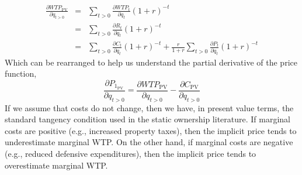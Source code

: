 \documentclass[ecta,nameyear,draft]{econsocart}
\theoremstyle{plain}
\theoremstyle{remark}
\begin{document}
\begin{eqnarray}
\frac{\partial \mathit{WTP}_{\mathrm{PV}}}{\partial q_{t>0}}&=&\sum_{t>0} \frac{\partial \mathit{WTP}_t}{\partial q_t}(1+r)^{-t}\label{pvmwtp}\nonumber\\ 
&=&\sum_{t>0} \frac{\partial R_t}{\partial q_t}(1+r)^{-t}\nonumber\\
&=&\sum_{t>0} \frac{\partial C_t}{\partial q_t}(1+r)^{-t}+\frac{r}{1+r}\sum_{t>0} \frac{\partial P_t}{\partial q_t}(1+r)^{-t}\nonumber
\end{eqnarray}
Which can be rearranged to help us understand the partial derivative of the price function,
\begin{equation}
	\frac{\partial P_{1_{\mathrm{PV}}}} {\partial q_{t>0}}=\frac{\partial \mathit{WTP}_{\mathrm{PV}}}{\partial q_{t>0}}-\frac{\partial C_{\mathrm{PV}}}{\partial q_{t>0}} \label{marginalPrice}
\end{equation}
If we assume that costs do not change, then we have, in present value terms, the standard tangency condition used in the static ownership literature. If marginal costs are positive (e.g., increased property taxes), then the implicit price tends to underestimate marginal WTP. On the other hand, if marginal costs are negative (e.g., reduced defensive expenditures), then the implicit price tends to overestimate marginal WTP.
\end{document}
